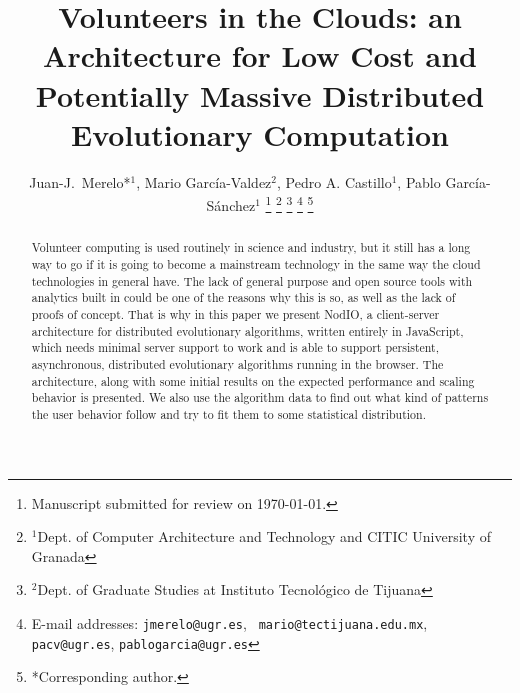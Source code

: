 \documentclass[journal,onecolumn]{IEEEtran}
\begin{document}
\title{Volunteers in the Clouds: an Architecture for Low Cost and
  Potentially Massive Distributed Evolutionary Computation}



\author{Juan-J.~Merelo*$^1$, Mario Garc\'ia-Valdez$^2$, Pedro A. Castillo$^1$, Pablo Garc\'ia-S\'anchez$^1$
\thanks{Manuscript submitted for review on \today.}%
\thanks{$^1$Dept. of Computer Architecture and Technology and CITIC University of Granada}%
\thanks{$^2$Dept. of Graduate Studies at Instituto Tecnol\'ogico de Tijuana}%
\thanks{E-mail addresses: {\tt jmerelo@ugr.es}, {\tt
    mario@tectijuana.edu.mx}, {\tt pacv@ugr.es}, {\tt pablogarcia@ugr.es}}%
\thanks{*Corresponding author.}%
}

\maketitle

\begin{abstract}
Volunteer computing is used routinely in science and industry, but it
still has a long way to go if it is going to become a mainstream technology in the
same way the cloud technologies in general have. The lack of general
purpose and open source tools
with analytics built in could be one of the reasons why this is so, as
well as the lack of proofs of concept. That is why in this paper we
present {\sf NodIO}, a client-server architecture for distributed
evolutionary algorithms, written entirely in JavaScript, which needs
minimal server support to work and is able to support persistent,
asynchronous, distributed evolutionary algorithms running in the
browser.  The architecture, along with some initial results on the
expected performance and scaling
behavior is presented. We also use the algorithm data to
find out what kind of patterns the user behavior follow and try to fit
them to some statistical distribution.
\end{abstract}
\end{document}
